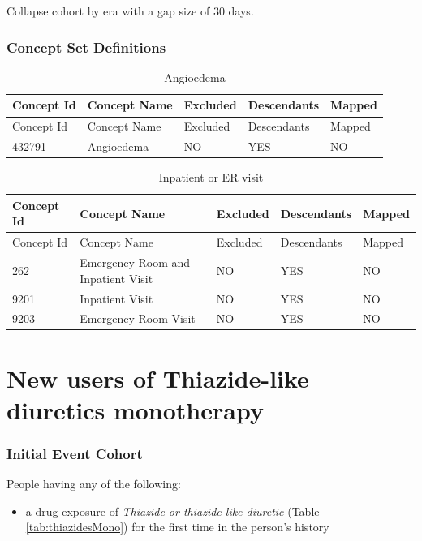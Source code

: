 \documentclass[11pt]{book}
\providecommand{\tightlist}{%
  \setlength{\itemsep}{0pt}\setlength{\parskip}{0pt}}
\theoremstyle{definition}
\theoremstyle{definition}
\theoremstyle{definition}
\theoremstyle{remark}
\begin{document}
Collapse cohort by era with a gap size of 30 days.

\hypertarget{concept-set-definitions-3}{%
\subsubsection*{Concept Set Definitions}\label{concept-set-definitions-3}}

\begin{longtable}[]{@{}lllll@{}}
\caption{\label{tab:angioedema} Angioedema}\tabularnewline
\toprule
Concept Id & Concept Name & Excluded & Descendants & Mapped\tabularnewline
\midrule
\endfirsthead
\toprule
Concept Id & Concept Name & Excluded & Descendants & Mapped\tabularnewline
\midrule
\endhead
432791 & Angioedema & NO & YES & NO\tabularnewline
\bottomrule
\end{longtable}

\begin{longtable}[]{@{}lllll@{}}
\caption{\label{tab:inpatientOrEr} Inpatient or ER visit}\tabularnewline
\toprule
Concept Id & Concept Name & Excluded & Descendants & Mapped\tabularnewline
\midrule
\endfirsthead
\toprule
Concept Id & Concept Name & Excluded & Descendants & Mapped\tabularnewline
\midrule
\endhead
262 & Emergency Room and Inpatient Visit & NO & YES & NO\tabularnewline
9201 & Inpatient Visit & NO & YES & NO\tabularnewline
9203 & Emergency Room Visit & NO & YES & NO\tabularnewline
\bottomrule
\end{longtable}

\hypertarget{ThiazidesMono}{%
\section{New users of Thiazide-like diuretics monotherapy}\label{ThiazidesMono}}

\hypertarget{initial-event-cohort-4}{%
\subsubsection*{Initial Event Cohort}\label{initial-event-cohort-4}}

People having any of the following:

\begin{itemize}
\tightlist
\item
  a drug exposure of \emph{Thiazide or thiazide-like diuretic} (Table \ref{tab:thiazidesMono}) for the first time in the person's history
\end{itemize}
\end{document}
